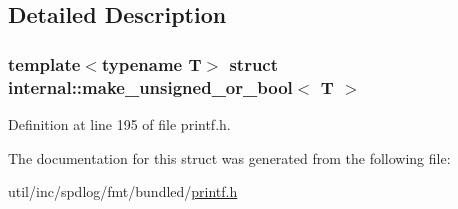 \subsection{Detailed Description}
\subsubsection*{template$<$typename T$>$\newline
struct internal\+::make\+\_\+unsigned\+\_\+or\+\_\+bool$<$ T $>$}



Definition at line 195 of file printf.\+h.



The documentation for this struct was generated from the following file\+:\begin{DoxyCompactItemize}
\item 
util/inc/spdlog/fmt/bundled/\hyperlink{printf_8h}{printf.\+h}\end{DoxyCompactItemize}
